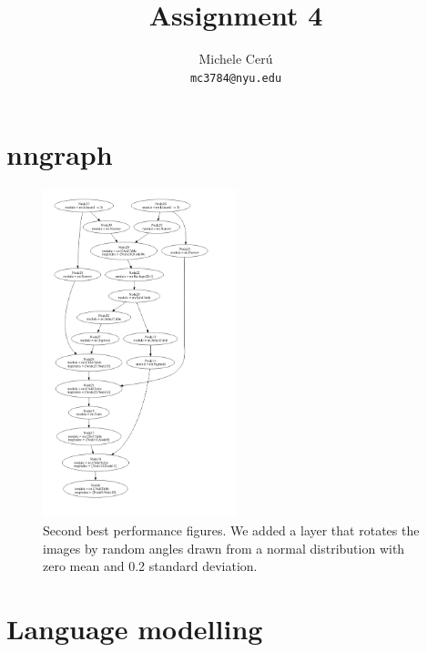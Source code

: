 \documentclass{article}
\title{Assignment 4}
\author{
  Michele Cer\'u
    \\
  \texttt{mc3784@nyu.edu} \\
}
\begin{document}

\maketitle


\section{nngraph}


\begin{figure}[ht!]
  \centering
  \includegraphics[width=0.50\textwidth]{GRU}
  \caption{Second best performance figures. We added a layer that rotates the images by random angles drawn from a normal distribution with zero mean and 0.2 standard deviation. \label{fig:best_performance}}
\end{figure}


\section{Language modelling}
\end{document}
